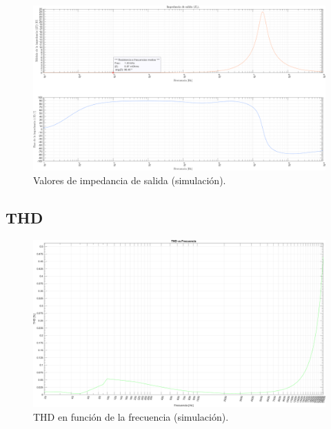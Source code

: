 \clearpage

\begin{figure}[H]
    \centering
    \includegraphics[angle=90,scale=0.45]{./img/simulaciones/Impedance/amplifier_Zo.png}
    \caption{Valores de impedancia de salida (simulación).}
    \label{fig:amplifier_Zo_sim}
\end{figure}

\clearpage

\subsection{THD}

\begin{figure}[H]
    \centering
    \includegraphics[angle=90,scale=0.47]{./img/simulaciones/THD/THD_vs_frequency_sim.png}
    \caption{THD en función de la frecuencia (simulación).}
    \label{fig:THD_vs_frequency_sim}
\end{figure}

